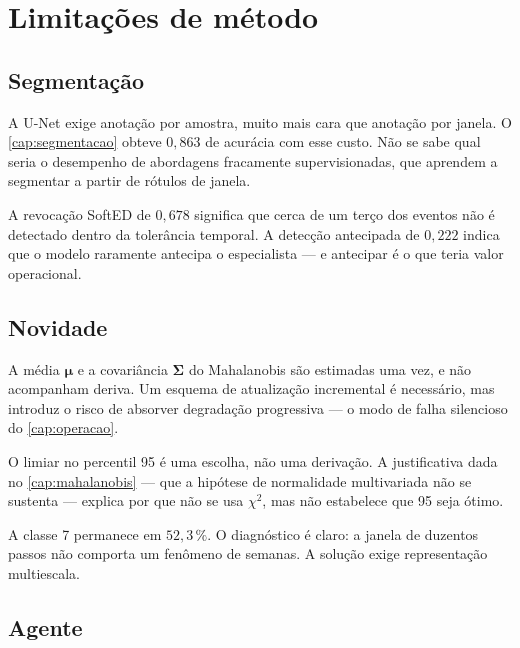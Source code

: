 \section{Limitações de método}

\subsection{Segmentação}

A U-Net exige anotação por amostra, muito mais cara que anotação por janela. O
\cref{cap:segmentacao} obteve $0{,}863$ de acurácia com esse custo. Não se sabe qual
seria o desempenho de abordagens fracamente supervisionadas, que aprendem a segmentar a
partir de rótulos de janela.

A revocação SoftED de $0{,}678$ significa que cerca de um terço dos eventos não é
detectado dentro da tolerância temporal. A detecção antecipada de $0{,}222$ indica que o
modelo raramente antecipa o especialista --- e antecipar é o que teria valor operacional.

\subsection{Novidade}

A média $\bm{\mu}$ e a covariância $\bm{\Sigma}$ do Mahalanobis são estimadas uma vez, e
não acompanham deriva. Um esquema de atualização incremental é necessário, mas introduz o
risco de absorver degradação progressiva --- o modo de falha silencioso do
\cref{cap:operacao}.

O limiar no percentil 95 é uma escolha, não uma derivação. A justificativa dada no
\cref{cap:mahalanobis} --- que a hipótese de normalidade multivariada não se sustenta ---
explica por que não se usa $\chi^2$, mas não estabelece que 95 seja ótimo.

A classe 7 permanece em $52{,}3\,\%$. O diagnóstico é claro: a janela de duzentos passos
não comporta um fenômeno de semanas. A solução exige representação multiescala.

\subsection{Agente}

